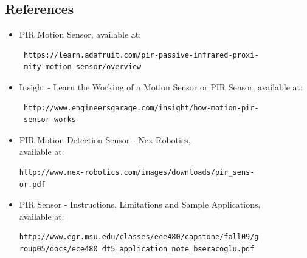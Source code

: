 \documentclass[a4paper,12 pt]{article}
\begin{document}
\newpage
\begin{center}
\section*{References}
\end{center}
\vspace{20mm}
\begin{itemize}
\item PIR Motion Sensor, available at:
\begin{verbatim}
 https://learn.adafruit.com/pir-passive-infrared-proxi-
 mity-motion-sensor/overview
\end{verbatim}
\item Insight - Learn the Working of a Motion Sensor or PIR Sensor, available at:
\begin{verbatim}
 http://www.engineersgarage.com/insight/how-motion-pir-
 sensor-works
\end{verbatim}

\item PIR Motion Detection Sensor - Nex Robotics, \\available at: 
\begin{verbatim}
http://www.nex-robotics.com/images/downloads/pir_sens-
or.pdf
\end{verbatim}

\item PIR  Sensor - Instructions, Limitations and Sample Applications, \\available at: 
\begin{verbatim}
http://www.egr.msu.edu/classes/ece480/capstone/fall09/g-
roup05/docs/ece480_dt5_application_note_bseracoglu.pdf
\end{verbatim}
\end{itemize}
\end{document}
